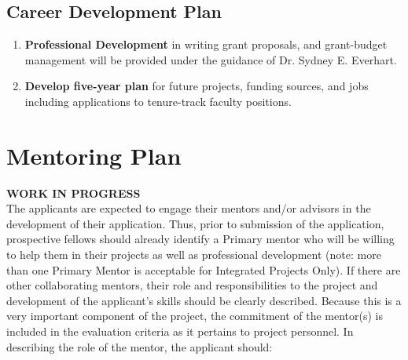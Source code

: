 \documentclass[12pt,letterpaper]{article}
\begin{document}
\subsection{Career Development Plan}

\begin{enumerate}
  \item \textbf{Professional Development} in writing grant proposals, and grant-budget management will be provided under the guidance of Dr. Sydney E. Everhart.
  \item \textbf{Develop five-year plan} for future projects, funding sources, and jobs including applications to tenure-track faculty positions.  
\end{enumerate}



\section{Mentoring Plan}

\noindent \textbf{WORK IN PROGRESS}\\
\noindent The applicants are expected to engage their mentors and/or advisors in the
development of their application. Thus, prior to submission of the
application, prospective fellows should already identify a Primary mentor who
will be willing to help them in their projects as well as professional
development (note: more than one Primary Mentor is acceptable for Integrated
Projects Only). If there are other collaborating mentors, their role and
responsibilities to the project and development of the applicant's skills
should be clearly described. Because this is a
very important component of the project, the commitment of the mentor(s) is
included in the evaluation criteria as it pertains to project personnel. In
describing the role of the mentor, the applicant should:
\end{document}
